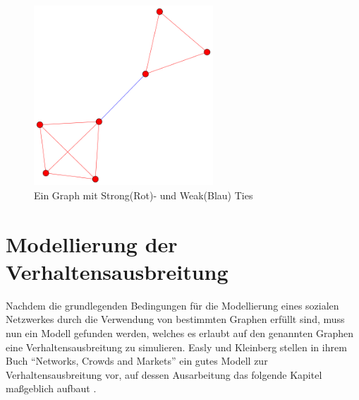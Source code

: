 \documentclass[12pt]{article}
\begin{document}
\begin{figure}
  \begin{center}
    \includegraphics[width=0.60\textwidth]{pic_tieGraph.png}
  \end{center}
  \caption{Ein Graph mit Strong(Rot)- und Weak(Blau) Ties}
  \label{pic_ties}
\end{figure}

 

\section{Modellierung der Verhaltensausbreitung}
\label{s_verhaltenmodel}
Nachdem die grundlegenden Bedingungen für die Modellierung eines sozialen Netzwerkes durch die Verwendung von bestimmten Graphen erfüllt sind, muss nun ein Modell gefunden werden, welches es erlaubt auf den genannten Graphen eine Verhaltensausbreitung zu simulieren. Easly und Kleinberg stellen in ihrem Buch "`Networks, Crowds and Markets"' ein gutes Modell zur Verhaltensausbreitung vor, auf dessen Ausarbeitung das folgende Kapitel maßgeblich aufbaut \cite{Easly10}.
\end{document}
